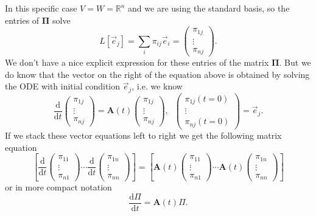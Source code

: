 \documentclass[11pt,fleqn]{article}
\begin{document}
\begin{enumerate}
\begin{itemize}
	In this specific case $V=W=\mathbb{R}^n$ and we are using the standard basis, so the entries of $\mathbf{\Pi}$ solve
	\[L[\vec{e}_j] = \sum_i \pi_{ij}\vec{e}_i = \left(\begin{array}{c}\pi_{1j}\\\vdots\\\pi_{nj}\end{array}\right).\]
	We don't have a nice explicit expression for these entries of the matrix $\mathbf{\Pi}$.
	But we do know that the vector on the right of the equation above is obtained by solving the ODE with initial condition $\vec{e}_j$, i.e. we know
	\[\frac{\mathrm{d}}{\mathrm{d}t} \left(\begin{array}{c}\pi_{1j}\\\vdots\\\pi_{nj}\end{array}\right) = \mathbf{A}(t)\left(\begin{array}{c}\pi_{1j}\\\vdots\\\pi_{nj}\end{array}\right),\;\;\left(\begin{array}{c}\pi_{1j}(t=0)\\\vdots\\\pi_{nj}(t=0)\end{array}\right)= \vec{e}_j.\]
	If we stack these vector equations left to right we get the following matrix equation
	\[\left[\frac{\mathrm{d}}{\mathrm{d}t} \left(\begin{array}{c}\pi_{11}\\\vdots\\\pi_{n1}\end{array}\right)\cdots\frac{\mathrm{d}}{\mathrm{d}t} \left(\begin{array}{c}\pi_{1n}\\\vdots\\\pi_{nn}\end{array}\right)\right] = \left[\mathbf{A}(t)\left(\begin{array}{c}\pi_{11}\\\vdots\\\pi_{n1}\end{array}\right)\cdots\mathbf{A}(t)\left(\begin{array}{c}\pi_{1n}\\\vdots\\\pi_{nn}\end{array}\right)\right]\]
	or in more compact notation
	\[\frac{\mathrm{d}\Pi}{\mathrm{d}t} = \mathbf{A}(t)\Pi.\]

\end{itemize}
\end{enumerate}
\end{document}
